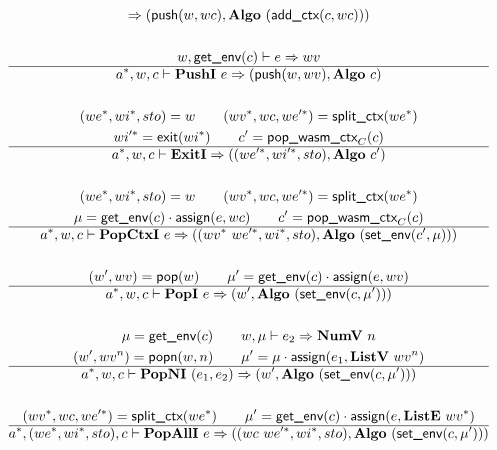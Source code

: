 \begin{gather*}
  \Rightarrow
  (\push(w, wc), \algo ~ (\addctx(c, wc))) \\
%
\newline \\
  w, \getenv(c) \vdash e \Rightarrow wv \\
  \hline
  \seq{a}, w, c \vdash \pushi ~ e \Rightarrow (\push(w, wv), \algo ~ c) \\
%
\newline \\
  (\seq{we}, \seq{wi}, sto) = w \qquad
  (\seq{wv}, wc, \seq{we'}) = \splitctx(\seq{we}) \\
  \seq{wi'} = \exit(\seq{wi}) \qquad
  c' = \popwasmctx_{C}(c) \\
  \hline
  \seq{a}, w, c \vdash \exiti
  \Rightarrow
  ((\seq{we'}, \seq{wi'}, sto), \algo ~ c') \\
%
\newline \\
  (\seq{we}, \seq{wi}, sto) = w \qquad
  (\seq{wv}, wc, \seq{we'}) = \splitctx(\seq{we}) \\
  \mu = \getenv(c) \cdot \assign(e, wc) \qquad
  c' = \popwasmctx_{C}(c) \\
  \hline
  \seq{a}, w, c \vdash \popctxi ~ e
  \Rightarrow
  ((\seq{wv} ~ \seq{we'}, \seq{wi}, sto), \algo ~ (\setenv(c', \mu))) \\
%
\newline \\
  (w', wv) = \pop(w) \qquad
  \mu' = \getenv(c) \cdot \assign(e, wv) \\
  \hline
  \seq{a}, w, c \vdash \popi ~ e \Rightarrow (w', \algo ~ (\setenv(c, \mu'))) \\
%
\newline \\
  \mu = \getenv(c) \qquad
  w, \mu \vdash e_2 \Rightarrow \numv ~ n \\
  (w', wv^n) = \popn(w, n) \qquad
  \mu' = \mu \cdot \assign(e_1, \listv ~ wv^n) \\
  \hline
  \seq{a}, w, c \vdash \popni ~ (e_1, e_2) \Rightarrow
  (w', \algo ~ (\setenv(c, \mu'))) \\
%
\newline \\
  (\seq{wv}, wc, \seq{we'}) = \splitctx(\seq{we}) \qquad
  \mu' = \getenv(c) \cdot \assign(e, \liste ~ \seq{wv}) \\
  \hline
  \seq{a}, (\seq{we}, \seq{wi}, sto), c \vdash \popalli ~ e
  \Rightarrow
  ((wc ~ \seq{we'}, \seq{wi}, sto), \algo ~ (\setenv(c, \mu'))) \\

\end{gather*}
